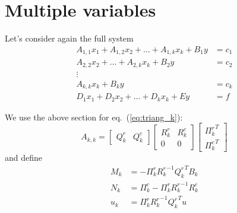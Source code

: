 \documentclass[]{article}
\newcommand{\BIN}{\begin{bmatrix}}
\newcommand{\BOUT}{\end{bmatrix}}
\begin{document}
\section{Multiple variables}
Let's consider again the full system
\begin{align}
A_{1,1} x_1 + A_{1,2} x_2 + \ldots + A_{1,k} x_k + B_1 y &= c_1 \label{eq:triang_1}\\
A_{2,2} x_2 + \ldots + A_{2,k} x_k + B_2 y &= c_2 \label{eq:triang_2}\\
\vdots& \nonumber\\
A_{k,k} x_k + B_k y &= c_k \label{eq:triang_k}\\
D_1 x_1 + D_2 x_2 + \ldots + D_k x_k + E y &= f \label{eq:other_}
\end{align}

We use the above section for eq.~(\ref{eq:triang_k}):
\begin{equation*}
	A_{k,k} = \BIN Q_k^r & Q_k^c \BOUT \BIN R_k^r & R_k^c \\ 0 & 0 \BOUT \BIN {\Pi_k^r}^T \\ {\Pi_k^c}^T \BOUT
\end{equation*}
and define
\begin{align*}
	M_k &= -\Pi^r_k {R_k^r}^{-1} {Q_k^r}^T B_k\\
	N_k &= \Pi^c_k - \Pi^r_k {R_k^r}^{-1} R_k^c\\
	u_k &= \Pi^r_k {R_k^r}^{-1} {Q_k^r}^T u
\end{align*}
\end{document}
